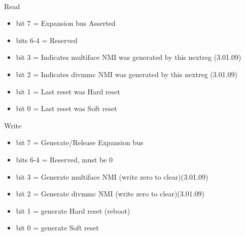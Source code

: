 \\
Read
\begin{itemize}
\item bit 7 = Expansion bus  Asserted
\item bits 6-4 = Reserved
\item bit 3 = Indicates multiface NMI was generated by this nextreg (3.01.09)
\item bit 2 = Indicates divmmc NMI was generated by this nextreg (3.01.09)
\item bit 1 = Last reset was Hard reset
\item bit 0 = Last reset was Soft reset
\end{itemize}
Write
\begin{itemize}
\item bit 7 = Generate/Release Expansion bus 
\item bits 6-4 = Reserved, must be 0
\item bit 3 = Generate multiface NMI (write zero to clear)(3.01.09)
\item bit 2 = Generate divmmc NMI (write zero to clear)(3.01.09)
\item bit 1 = generate Hard reset (reboot)
\item bit 0 = generate Soft reset
\end{itemize}

